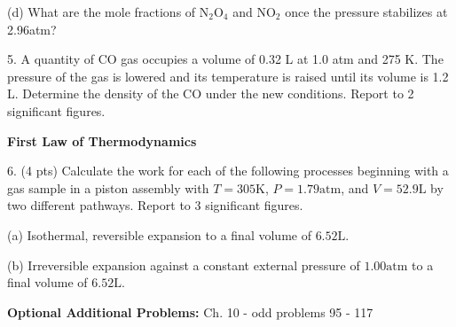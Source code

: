 \documentclass[11pt]{article}
\begin{document}
(d) What are the mole fractions of N$_2$O$_4$ and NO$_2$ once the pressure stabilizes at
2.96atm?

\vspace{2in}

5. A quantity of CO gas occupies a volume of 0.32 L at 1.0 atm and
275 K. The pressure of the gas is lowered and its temperature is
raised until its volume is 1.2 L. Determine the density of the CO
under the new conditions. Report to 2 significant figures.

\vspace{1in}

\textbf{First Law of Thermodynamics}

6. (4 pts) Calculate the work for each of the following processes beginning with a gas
sample in a piston assembly with $T=305\text{K}$, $P=1.79\text{atm}$, and
$V=52.9\text{L}$ by two different pathways. Report to 3 significant figures.

(a) Isothermal, reversible expansion to a final volume of $6.52\text{L}$.

(b) Irreversible expansion against a constant external pressure of $1.00\text{atm}$
to a final volume of $6.52\text{L}$.

\vfill
\textbf{Optional Additional Problems:} Ch. 10 - odd problems 95 - 117
\end{document}
